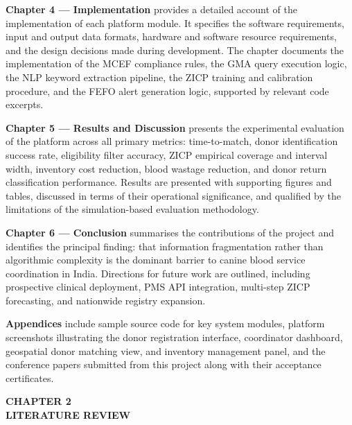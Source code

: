 \documentclass[12pt,a4paper]{article}
\begin{document}
\vspace{0.6em}
\noindent \textbf{Chapter 4 — Implementation} provides a detailed account of the implementation of each platform module. It specifies the software requirements, input and output data formats, hardware and software resource requirements, and the design decisions made during development. The chapter documents the implementation of the MCEF compliance rules, the GMA query execution logic, the NLP keyword extraction pipeline, the ZICP training and calibration procedure, and the FEFO alert generation logic, supported by relevant code excerpts.

\vspace{0.6em}
\noindent \textbf{Chapter 5 — Results and Discussion} presents the experimental evaluation of the platform across all primary metrics: time-to-match, donor identification success rate, eligibility filter accuracy, ZICP empirical coverage and interval width, inventory cost reduction, blood wastage reduction, and donor return classification performance. Results are presented with supporting figures and tables, discussed in terms of their operational significance, and qualified by the limitations of the simulation-based evaluation methodology.

\vspace{0.6em}
\noindent \textbf{Chapter 6 — Conclusion} summarises the contributions of the project and identifies the principal finding: that information fragmentation rather than algorithmic complexity is the dominant barrier to canine blood service coordination in India. Directions for future work are outlined, including prospective clinical deployment, PMS API integration, multi-step ZICP forecasting, and nationwide registry expansion.

\vspace{0.6em}
\noindent \textbf{Appendices} include sample source code for key system modules, platform screenshots illustrating the donor registration interface, coordinator dashboard, geospatial donor matching view, and inventory management panel, and the conference papers submitted from this project along with their acceptance certificates.

\newpage
\begin{center}
    \textbf{\large CHAPTER 2}\\[0.4em]
    \textbf{\large LITERATURE REVIEW}
\end{center}
\vspace{1.5em}
\end{document}
